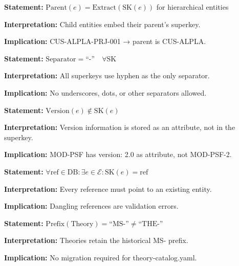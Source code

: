 \begin{tcolorbox}[colback=gray!5!white, colframe=gray!75!black,
    title=Axiom UNMAPPED_SK-4: Hierarchical Embedding]
\textbf{Statement:} $\text{Parent}(e) = \text{Extract}(\text{SK}(e))$ for hierarchical entities

\textbf{Interpretation:} Child entities embed their parent's superkey.

\textbf{Implication:} CUS-ALPLA-PRJ-001 → parent is CUS-ALPLA.
\end{tcolorbox}

\begin{tcolorbox}[colback=gray!5!white, colframe=gray!75!black,
    title=Axiom UNMAPPED_SK-5: Separator Consistency]
\textbf{Statement:} $\text{Separator} = \text{``-''} \quad \forall \text{SK}$

\textbf{Interpretation:} All superkeys use hyphen as the only separator.

\textbf{Implication:} No underscores, dots, or other separators allowed.
\end{tcolorbox}

\begin{tcolorbox}[colback=gray!5!white, colframe=gray!75!black,
    title=Axiom UNMAPPED_SK-6: Version Externality]
\textbf{Statement:} $\text{Version}(e) \notin \text{SK}(e)$

\textbf{Interpretation:} Version information is stored as an attribute, not in the superkey.

\textbf{Implication:} MOD-PSF has version: 2.0 as attribute, not MOD-PSF-2.
\end{tcolorbox}

\begin{tcolorbox}[colback=gray!5!white, colframe=gray!75!black,
    title=Axiom UNMAPPED_SK-7: Reference Validity]
\textbf{Statement:} $\forall \text{ref} \in \text{DB}: \exists e \in \mathcal{E}: \text{SK}(e) = \text{ref}$

\textbf{Interpretation:} Every reference must point to an existing entity.

\textbf{Implication:} Dangling references are validation errors.
\end{tcolorbox}

\begin{tcolorbox}[colback=gray!5!white, colframe=gray!75!black,
    title=Axiom UNMAPPED_SK-8: Historical Exception]
\textbf{Statement:} $\text{Prefix}(\text{Theory}) = \text{``MS-''} \neq \text{``THE-''}$

\textbf{Interpretation:} Theories retain the historical MS- prefix.

\textbf{Implication:} No migration required for theory-catalog.yaml.
\end{tcolorbox}

